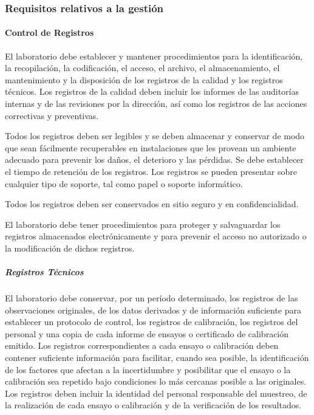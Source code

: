 \newpage
\thispagestyle{plain}

	\subsubsection{Requisitos relativos a la gestión}
		\paragraph{Control de Registros} 
			\par 
				El laboratorio debe establecer y mantener procedimientos para la identificación, la recopilación,
				la codificación, el acceso, el archivo, el almacenamiento, el mantenimiento y la disposición de los registros de
				la calidad y los registros técnicos. Los registros de la calidad deben incluir los informes de las auditorías
				internas y de las revisiones por la dirección, así como los registros de las acciones correctivas y preventivas.
				
			\par \noindent
				Todos los registros deben ser legibles y se deben almacenar y conservar de modo que sean
				fácilmente recuperables en instalaciones que les provean un ambiente adecuado para prevenir los daños, el deterioro y las pérdidas. Se debe establecer el tiempo de retención de los registros. Los registros se pueden presentar sobre cualquier tipo de soporte, tal como papel o soporte informático.
				
			\par \noindent
				Todos los registros deben ser conservados en sitio seguro y en confidencialidad.
				
			\par \noindent
				El laboratorio debe tener procedimientos para proteger y salvaguardar los registros almacenados
				electrónicamente y para prevenir el acceso no autorizado o la modificación de dichos registros.
			
			\subparagraph{Registros Técnicos}
				\par 
					El laboratorio debe conservar, por un período determinado, los registros de las observaciones
					originales, de los datos derivados y de información suficiente para establecer un protocolo de control, los
					registros de calibración, los registros del personal y una copia de cada informe de ensayos o certificado de
					calibración emitido. Los registros correspondientes a cada ensayo o calibración deben contener suficiente
					información para facilitar, cuando sea posible, la identificación de los factores que afectan a la incertidumbre y
					posibilitar que el ensayo o la calibración sea repetido bajo condiciones lo más cercanas posible a las
					originales. Los registros deben incluir la identidad del personal responsable del muestreo, de la realización de
					cada ensayo o calibración y de la verificación de los resultados.
					
